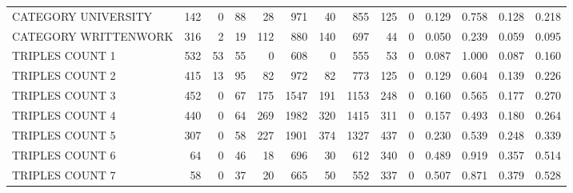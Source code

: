 \begin{tabular}{lrrrrrrrrrllll}
 CATEGORY UNIVERSITY      &             142 &             0 &              88 &              28 &             971 &   40 &  855 &  125 &    0 & 0.129 & 0.758 & 0.128 & 0.218 \\
 CATEGORY WRITTENWORK     &             316 &             2 &              19 &             112 &             880 &  140 &  697 &   44 &    0 & 0.050 & 0.239 & 0.059 & 0.095 \\
 TRIPLES COUNT 1          &             532 &            53 &              55 &               0 &             608 &    0 &  555 &   53 &    0 & 0.087 & 1.000 & 0.087 & 0.160 \\
 TRIPLES COUNT 2          &             415 &            13 &              95 &              82 &             972 &   82 &  773 &  125 &    0 & 0.129 & 0.604 & 0.139 & 0.226 \\
 TRIPLES COUNT 3          &             452 &             0 &              67 &             175 &            1547 &  191 & 1153 &  248 &    0 & 0.160 & 0.565 & 0.177 & 0.270 \\
 TRIPLES COUNT 4          &             440 &             0 &              64 &             269 &            1982 &  320 & 1415 &  311 &    0 & 0.157 & 0.493 & 0.180 & 0.264 \\
 TRIPLES COUNT 5          &             307 &             0 &              58 &             227 &            1901 &  374 & 1327 &  437 &    0 & 0.230 & 0.539 & 0.248 & 0.339 \\
 TRIPLES COUNT 6          &              64 &             0 &              46 &              18 &             696 &   30 &  612 &  340 &    0 & 0.489 & 0.919 & 0.357 & 0.514 \\
 TRIPLES COUNT 7          &              58 &             0 &              37 &              20 &             665 &   50 &  552 &  337 &    0 & 0.507 & 0.871 & 0.379 & 0.528 \\
\hline
\end{tabular}